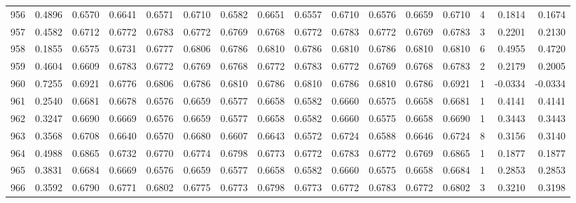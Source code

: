 \begin{tabular}{lrrrrrrrrrrrrrrr}
956 &      0.4896 &  0.6570 &  0.6641 &  0.6571 &  0.6710 &  0.6582 &  0.6651 &  0.6557 &  0.6710 &  0.6576 &   0.6659 &     0.6710 &      4 &                    0.1814 &                     0.1674 \\
957 &      0.4582 &  0.6712 &  0.6772 &  0.6783 &  0.6772 &  0.6769 &  0.6768 &  0.6772 &  0.6783 &  0.6772 &   0.6769 &     0.6783 &      3 &                    0.2201 &                     0.2130 \\
958 &      0.1855 &  0.6575 &  0.6731 &  0.6777 &  0.6806 &  0.6786 &  0.6810 &  0.6786 &  0.6810 &  0.6786 &   0.6810 &     0.6810 &      6 &                    0.4955 &                     0.4720 \\
959 &      0.4604 &  0.6609 &  0.6783 &  0.6772 &  0.6769 &  0.6768 &  0.6772 &  0.6783 &  0.6772 &  0.6769 &   0.6768 &     0.6783 &      2 &                    0.2179 &                     0.2005 \\
960 &      0.7255 &  0.6921 &  0.6776 &  0.6806 &  0.6786 &  0.6810 &  0.6786 &  0.6810 &  0.6786 &  0.6810 &   0.6786 &     0.6921 &      1 &                   -0.0334 &                    -0.0334 \\
961 &      0.2540 &  0.6681 &  0.6678 &  0.6576 &  0.6659 &  0.6577 &  0.6658 &  0.6582 &  0.6660 &  0.6575 &   0.6658 &     0.6681 &      1 &                    0.4141 &                     0.4141 \\
962 &      0.3247 &  0.6690 &  0.6669 &  0.6576 &  0.6659 &  0.6577 &  0.6658 &  0.6582 &  0.6660 &  0.6575 &   0.6658 &     0.6690 &      1 &                    0.3443 &                     0.3443 \\
963 &      0.3568 &  0.6708 &  0.6640 &  0.6570 &  0.6680 &  0.6607 &  0.6643 &  0.6572 &  0.6724 &  0.6588 &   0.6646 &     0.6724 &      8 &                    0.3156 &                     0.3140 \\
964 &      0.4988 &  0.6865 &  0.6732 &  0.6770 &  0.6774 &  0.6798 &  0.6773 &  0.6772 &  0.6783 &  0.6772 &   0.6769 &     0.6865 &      1 &                    0.1877 &                     0.1877 \\
965 &      0.3831 &  0.6684 &  0.6669 &  0.6576 &  0.6659 &  0.6577 &  0.6658 &  0.6582 &  0.6660 &  0.6575 &   0.6658 &     0.6684 &      1 &                    0.2853 &                     0.2853 \\
966 &      0.3592 &  0.6790 &  0.6771 &  0.6802 &  0.6775 &  0.6773 &  0.6798 &  0.6773 &  0.6772 &  0.6783 &   0.6772 &     0.6802 &      3 &                    0.3210 &                     0.3198 \\

\end{tabular}
